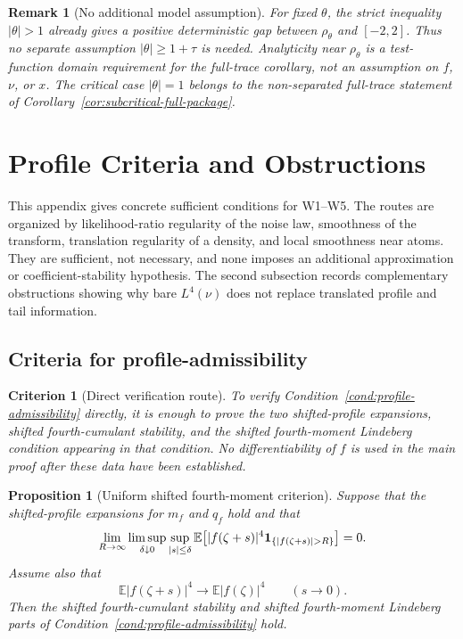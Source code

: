 \documentclass[10pt,a4paper]{amsart}
\newtheorem{proposition}[theorem]{Proposition}
\newtheorem{criterion}[theorem]{Criterion}
\newtheorem{remark}[theorem]{Remark}
\newcommand{\E}{\mathbb E}
\begin{document}
\begin{remark}[No additional model assumption]
For fixed \(\theta\), the strict inequality \(|\theta|>1\) already gives a
positive deterministic gap between \(\rho_\theta\) and \([-2,2]\).  Thus no
separate assumption \(|\theta|\ge1+\tau\) is needed.  Analyticity near
\(\rho_\theta\) is a test-function domain requirement for the full-trace
corollary, not an assumption on \(f\), \(\nu\), or \(x\).  The critical case
\(|\theta|=1\) belongs to the non-separated full-trace statement of
Corollary~\ref{cor:subcritical-full-package}.
\end{remark}
\section{Profile Criteria and Obstructions}
\label{app:assumption-W-criteria}

This appendix gives concrete sufficient conditions for W1--W5.  The routes
are organized by likelihood-ratio regularity of the noise law, smoothness of
the transform, translation regularity of a density, and local smoothness near
atoms.  They are sufficient, not necessary, and none imposes an additional
approximation or coefficient-stability hypothesis.  The second subsection
records complementary obstructions showing why bare $L^4(\nu)$ does not
replace translated profile and tail information.

\subsection{Criteria for profile-admissibility}

\begin{criterion}[Direct verification route]
\label{crit:direct-profile-verification}
To verify Condition~\ref{cond:profile-admissibility} directly, it is enough to prove the two shifted-profile expansions, shifted fourth-cumulant stability, and the shifted fourth-moment Lindeberg condition appearing in that condition.  No differentiability of \(f\) is used in the main proof after these data have been established.
\end{criterion}

\begin{proposition}[Uniform shifted fourth-moment criterion]
\label{prop:W-TUI}
Suppose that the shifted-profile expansions for \(m_f\) and \(q_f\) hold and that
\[
\lim_{R\to\infty}\limsup_{\delta\downarrow0}
\sup_{|s|\le\delta}
\E\bigl[|f(\zeta+s)|^4{\bf 1}_{\{|f(\zeta+s)|>R\}}\bigr]=0.
\]
Assume also that
\[
        \E |f(\zeta+s)|^4\longrightarrow \E |f(\zeta)|^4
        \qquad(s\to0).
\]
Then the shifted fourth-cumulant stability and shifted fourth-moment Lindeberg parts of Condition~\ref{cond:profile-admissibility} hold.
\end{proposition}
\end{document}
